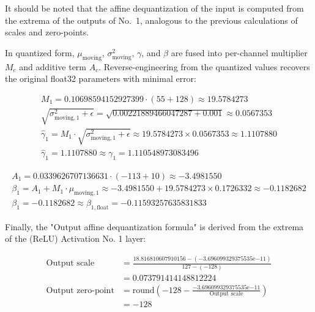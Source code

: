 {It should be noted that the affine dequantization of the  input is computed from the extrema of the outputs of  No.~1,
analogous to the previous calculations of scales and zero-points.

In quantized form, $\mu_{\text{moving}}$, $\sigma^2_{\text{moving}}$, $\gamma$, and $\beta$ are fused into per-channel multiplier $M_c$ and additive term $A_c$.
Reverse-engineering from the quantized values recovers the original \gls{float32} parameters with minimal error:

\begin{equation*}
\begin{gathered}
M_1 = 0.10698594152927399 \cdot (55 + 128) \approx 19.5784273 \\
\sqrt{\sigma^2_{\text{moving},1} + \epsilon} = \sqrt{0.00221889466047287 + 0.001} \approx 0.0567353 \\
\hat{\gamma}_1 = M_1 \cdot \sqrt{\sigma^2_{\text{moving},1} + \epsilon} \approx 19.5784273 \times 0.0567353 \approx 1.1107880 \\
\hat{\gamma}_1 = 1.1107880 \approx \gamma_1 = 1.110548973083496
\end{gathered}
\end{equation*}


\begin{equation*}
\begin{gathered}
A_1 = 0.0339626707136631 \cdot (-113 + 10) \approx -3.4981550 \\
\beta_1 = A_1 + M_1 \cdot \mu_{\text{moving},1} \approx -3.4981550 + 19.5784273 \times 0.1726332 \approx -0.1182682 \\
\beta_1 = -0.1182682 \approx \beta_{1,\text{float}} = -0.11593257635831833
\end{gathered}
\end{equation*}

Finally, the "Output affine dequantization formula" is derived from the extrema of the (ReLU) Activation No. 1 layer:

\[
\begin{array}{rl}
\text{Output scale} &= \frac{18.816810607910156 - (-3.696099329375535 \mathrm{e}{-11})}{127 - (-128)} \\
             &= 0.073791414148812224 \\[8pt]
\text{Output zero-point} &= \text{round}\left( -128 - \frac{-3.696099329375535 \mathrm{e}{-11}}{\text{Output scale}} \right) \\
                  &= -128
\end{array}
\]


}
